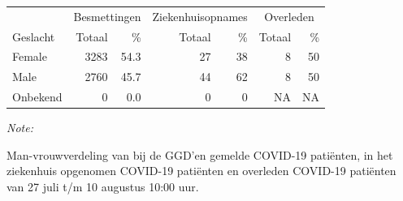 \documentclass[
  english,
  man,floatsintext]{apa6}
\begin{document}
\begin{table}[H]
\centering\begingroup\fontsize{11}{13}\selectfont

\begin{threeparttable}
\begin{tabular}{lrrrrrr}
\toprule
\multicolumn{1}{c}{ } & \multicolumn{2}{c}{Besmettingen} & \multicolumn{2}{c}{Ziekenhuisopnames} & \multicolumn{2}{c}{Overleden} \\
\cmidrule(l{3pt}r{3pt}){2-3} \cmidrule(l{3pt}r{3pt}){4-5} \cmidrule(l{3pt}r{3pt}){6-7}
Geslacht & Totaal & \% & Totaal & \% & Totaal & \%\\
\midrule
Female & 3283 & 54.3 & 27 & 38 & 8 & 50\\
Male & 2760 & 45.7 & 44 & 62 & 8 & 50\\
Onbekend & 0 & 0.0 & 0 & 0 & NA & NA\\
\bottomrule
\end{tabular}
\begin{tablenotes}
\item \textit{Note: } 
\item Man-vrouwverdeling van bij de GGD’en gemelde COVID-19 patiënten, in het ziekenhuis opgenomen COVID-19 patiënten en overleden COVID-19 patiënten van 27 juli t/m 10 augustus 10:00 uur.
\end{tablenotes}
\end{threeparttable}
\endgroup{}
\end{table}
\newpage
\end{document}
